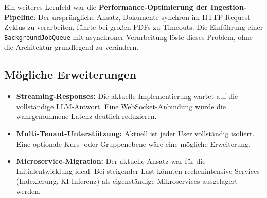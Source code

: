 Ein weiteres Lernfeld war die \textbf{Performance-Optimierung der Ingestion-Pipeline}: Der ursprüngliche Ansatz, Dokumente synchron im HTTP-Request-Zyklus zu verarbeiten, führte bei großen PDFs zu Timeouts. Die Einführung einer \texttt{BackgroundJobQueue} mit asynchroner Verarbeitung löste dieses Problem, ohne die Architektur grundlegend zu verändern.

\subsection{Mögliche Erweiterungen}
\begin{itemize}
    \item \textbf{Streaming-Responses:} Die aktuelle Implementierung wartet auf die vollständige LLM-Antwort. Eine WebSocket-Anbindung würde die wahrgenommene Latenz deutlich reduzieren.
    \item \textbf{Multi-Tenant-Unterstützung:} Aktuell ist jeder User vollständig isoliert. Eine optionale Kurs- oder Gruppenebene wäre eine mögliche Erweiterung.
    \item \textbf{Microservice-Migration:} Der aktuelle Ansatz war für die Initialentwicklung ideal. Bei steigender Last könnten rechenintensive Services (Indexierung, KI-Inferenz) als eigenständige Mikroservices ausgelagert werden.
\end{itemize}
